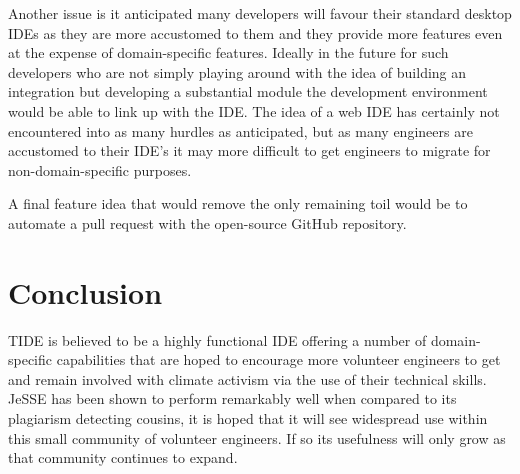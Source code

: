 \documentclass[jou,apacite]{apa6}
\begin{document}
Another issue is it anticipated many developers will favour their standard desktop IDEs as they are more accustomed to them and they provide more features even at the expense of domain-specific features. Ideally in the future for such developers who are not simply playing around with the idea of building an integration but developing a substantial module the development environment would be able to link up with the IDE. The idea of a web IDE has certainly not encountered into as many hurdles as anticipated, but as many engineers are accustomed to their IDE's it may more difficult to get engineers to migrate for non-domain-specific purposes. 

A final feature idea that would remove the only remaining toil would be to automate a pull request with the open-source GitHub repository.

\clearpage

\section{Conclusion}
TIDE is believed to be a highly functional IDE offering a number of domain-specific capabilities that are hoped to encourage more volunteer engineers to get and remain involved with climate activism via the use of their technical skills. JeSSE has been shown to perform remarkably well when compared to its plagiarism detecting cousins, it is hoped that it will see widespread use within this small community of volunteer engineers. If so its usefulness will only grow as that community continues to expand. 


\end{document}
